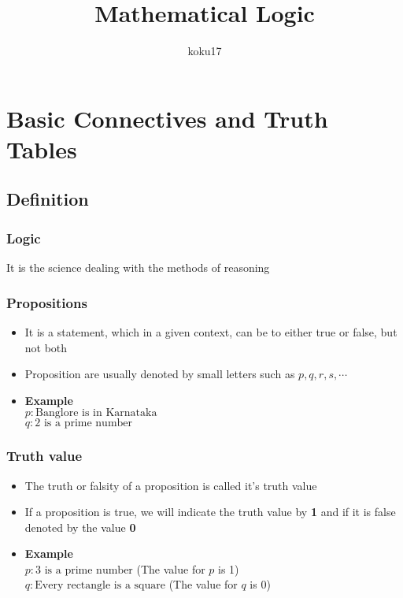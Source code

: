 \documentclass{article}
\author{koku17}
\title{Mathematical Logic}
\begin{document}
	\maketitle \thispagestyle{empty} \newpage
	\tableofcontents \thispagestyle{empty} \newpage
	\setcounter{page}{1}
	\section{Basic Connectives and Truth Tables}
	\subsection{Definition}
	\subsubsection{Logic}
	It is the science dealing with the methods of reasoning

	\subsubsection{Propositions}
	\begin{itemize}
		\item It is a statement, which in a given context, can be to either true or false, but not both
		\item Proposition are usually denoted by small letters such as $p,q,r,s,\cdots$
		\item [] \textbf{Example} \\
			$p : \text{Banglore is in Karnataka}$ \\
			$q : \text{2 is a prime number}$
	\end{itemize}

	\subsubsection{Truth value}
	\begin{itemize}
		\item The truth or falsity of a proposition is called it's truth value
		\item If a proposition is true, we will indicate the truth value by \textbf{1} and
			if it is false denoted by the value \textbf{0}
		\item [] \textbf{Example} \\
			$p : \text{3 is a prime number}$ (The value for $p$ is 1) \\
			$q : \text{Every rectangle is a square}$ (The value for $q$ is 0)
	\end{itemize}
\end{document}
